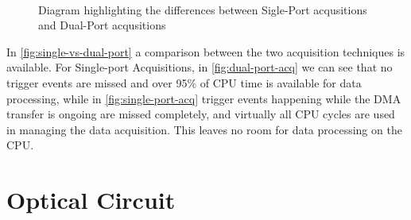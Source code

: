     \begin{figure}[bth]
    \myfloatalign
     \\
    \caption{Diagram highlighting the differences between Sigle-Port acqusitions and Dual-Port acqusitions}\label{fig:single-vs-dual-port}
    \end{figure}

    In \autoref{fig:single-vs-dual-port} a comparison between the two acquisition techniques is available. For Single-port Acquisitions, in \autoref{fig:dual-port-acq} we can see that no trigger events are missed and over 95\% of CPU time is available for data processing, while in \autoref{fig:single-port-acq} trigger events happening while the DMA transfer is ongoing are missed completely, and virtually all CPU cycles are used in managing the data acquisition. This leaves no room for data processing on the CPU. 
    


\section{Optical Circuit}

